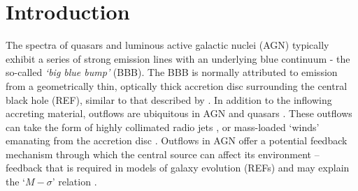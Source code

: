\documentclass[preprint, a4paper, 11pt]{aastex}
\begin{document}
\maketitle



%
%

\section{Introduction}


The spectra of 
quasars and luminous active galactic nuclei (AGN) 
typically exhibit a series of strong emission lines
with an underlying blue continuum - the so-called {\sl `big blue bump'} (BBB). 
The BBB is normally attributed to emission from a geometrically thin, 
optically thick accretion disc surrounding the central black hole (REF), similar
to that described by \cite{shakurasunyaev1973}.
In addition to the inflowing accreting material, 
outflows are ubiquitous in AGN
and quasars \citep{kellerman1989,ganguly2008}. These outflows can take the form of 
highly collimated radio jets \citep[e.g.][]{hazard1963,potash1980,perley1984,marscher2006}, 
or mass-loaded `winds' emanating from the accretion disc 
\citep{weymann1991,turnermiller2009}. 
Outflows in AGN offer a 
potential feedback mechanism through which the central source can 
affect its environment \citep{king2003,king2005,fabian2012}
-- feedback that is required in models of galaxy evolution (REFs) 
and may explain the `$M-\sigma$' relation \citep{silkrees1998,haring2004}.
\end{document}
